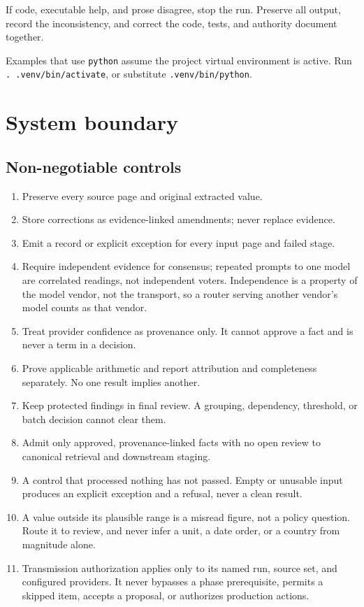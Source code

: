 \documentclass[
]{article}
\providecommand{\tightlist}{%
  \setlength{\itemsep}{0pt}\setlength{\parskip}{0pt}}
\begin{document}
If code, executable help, and prose disagree, stop the run. Preserve all
output, record the inconsistency, and correct the code, tests, and
authority document together.

Examples that use \texttt{python} assume the project virtual environment
is active. Run \texttt{. .venv/\allowbreak{}bin/\allowbreak{}activate},
or substitute \texttt{.venv/\allowbreak{}bin/\allowbreak{}python}.

\section{System boundary}\label{system-boundary}

\subsection{Non-negotiable controls}\label{non-negotiable-controls}

\begin{enumerate}
\def\labelenumi{\arabic{enumi}.}
\tightlist
\item
  Preserve every source page and original extracted value.
\item
  Store corrections as evidence-linked amendments; never replace
  evidence.
\item
  Emit a record or explicit exception for every input page and failed
  stage.
\item
  Require independent evidence for consensus; repeated prompts to one
  model are correlated readings, not independent voters. Independence is
  a property of the model vendor, not the transport, so a router serving
  another vendor's model counts as that vendor.
\item
  Treat provider confidence as provenance only. It cannot approve a fact
  and is never a term in a decision.
\item
  Prove applicable arithmetic and report attribution and completeness
  separately. No one result implies another.
\item
  Keep protected findings in final review. A grouping, dependency,
  threshold, or batch decision cannot clear them.
\item
  Admit only approved, provenance-linked facts with no open review to
  canonical retrieval and downstream staging.
\item
  A control that processed nothing has not passed. Empty or unusable
  input produces an explicit exception and a refusal, never a clean
  result.
\item
  A value outside its plausible range is a misread figure, not a policy
  question. Route it to review, and never infer a unit, a date order, or
  a country from magnitude alone.
\item
  Transmission authorization applies only to its named run, source set,
  and configured providers. It never bypasses a phase prerequisite,
  permits a skipped item, accepts a proposal, or authorizes production
  actions.
\end{enumerate}
\end{document}
